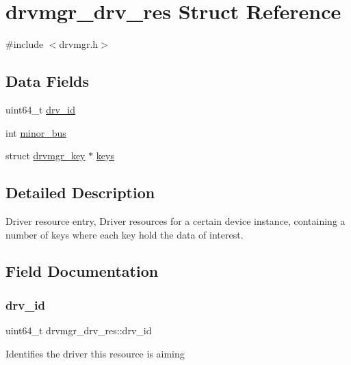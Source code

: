 \hypertarget{structdrvmgr__drv__res}{}\section{drvmgr\+\_\+drv\+\_\+res Struct Reference}
\label{structdrvmgr__drv__res}


{\ttfamily \#include $<$drvmgr.\+h$>$}

\subsection*{Data Fields}
\begin{DoxyCompactItemize}
\item 
uint64\+\_\+t \mbox{\hyperlink{structdrvmgr__drv__res_aafcfa881872340b0f64d2796dba4dc33}{drv\+\_\+id}}
\item 
int \mbox{\hyperlink{structdrvmgr__drv__res_a55ee0835a6a4b9e8f9719f3c6c0387b7}{minor\+\_\+bus}}
\item 
struct \mbox{\hyperlink{structdrvmgr__key}{drvmgr\+\_\+key}} $\ast$ \mbox{\hyperlink{structdrvmgr__drv__res_a631c7ca06de7310a13421f42aeb6efea}{keys}}
\end{DoxyCompactItemize}


\subsection{Detailed Description}
Driver resource entry, Driver resources for a certain device instance, containing a number of keys where each key hold the data of interest. 

\subsection{Field Documentation}
\mbox{\label{structdrvmgr__drv__res_aafcfa881872340b0f64d2796dba4dc33}} 
\subsubsection{\texorpdfstring{drv\_id}{drv\_id}}
{\footnotesize\ttfamily uint64\+\_\+t drvmgr\+\_\+drv\+\_\+res\+::drv\+\_\+id}

Identifies the driver this resource is aiming \mbox{\label{structdrvmgr__drv__res_a631c7ca06de7310a13421f42aeb6efea}} 
